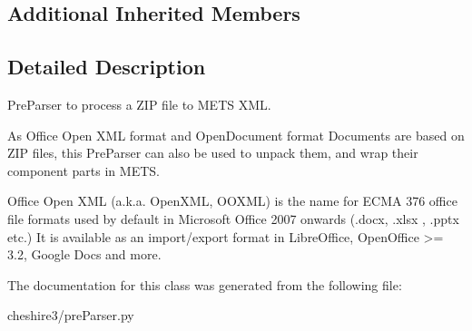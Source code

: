 \subsection*{Additional Inherited Members}


\subsection{Detailed Description}
\begin{DoxyVerb}PreParser to process a ZIP file to METS XML.

As Office Open XML format and OpenDocument format Documents are based on
ZIP files, this PreParser can also be used to unpack them, and wrap their
component parts in METS.

Office Open XML (a.k.a. OpenXML, OOXML) is the name for ECMA 376 office
file formats used by default in Microsoft Office 2007 onwards (.docx,
.xlsx , .pptx etc.) It is available as an import/export format in
LibreOffice, OpenOffice >= 3.2, Google Docs and more.\end{DoxyVerb}
 

The documentation for this class was generated from the following file\-:\begin{DoxyCompactItemize}
\item 
cheshire3/pre\-Parser.\-py\end{DoxyCompactItemize}

